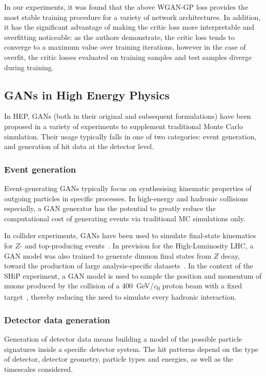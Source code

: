 In our experiments, it was found that the above WGAN-GP loss provides the most stable training procedure for a variety of network architectures. In addition, it has the significant advantage of making the critic loss more interpretable and overfitting noticeable: as the authors demonstrate, the critic loss tends to converge to a maximum value over training iterations, however in the case of overfit, the critic losses evaluated on training samples and test samples diverge during training.

\subsection{GANs in High Energy Physics}
In HEP, GANs (both in their original and subsequent formulations) have been proposed in a variety of experiments to supplement traditional Monte Carlo simulation. Their usage typically falls in one of two categories: event generation, and generation of hit data at the detector level.

\subsubsection{Event generation}
Event-generating GANs typically focus on synthesising kinematic properties of outgoing particles in specific processes. In high-energy and hadronic collisions especially, a GAN generator has the potential to greatly reduce the computational cost of generating events via traditional MC simulations only.

In collider experiments, GANs have been used to simulate final-state kinematics for $Z$- and top-producing events~\cite{butter_how_2019, otten_event_2019}. 
In prevision for the High-Luminosity LHC, a GAN model was also trained to generate dimuon final states from $Z$ decay, toward the production of large analysis-specific datasets~\cite{hashemi2019lhc}.
In the context of the SHiP experiment, a GAN model is used to sample the position and momentum of muons produced by the collision of a \SI{400}{\GeV/\clight} proton beam with a fixed target~\cite{ahdida_fast_2019}, thereby reducing the need to simulate every hadronic interaction.


\subsubsection{Detector data generation}
Generation of detector data means building a model of the possible particle signatures inside a specific detector system. The hit patterns depend on the type of detector, detector geometry, particle types and energies, as well as the timescales considered.

